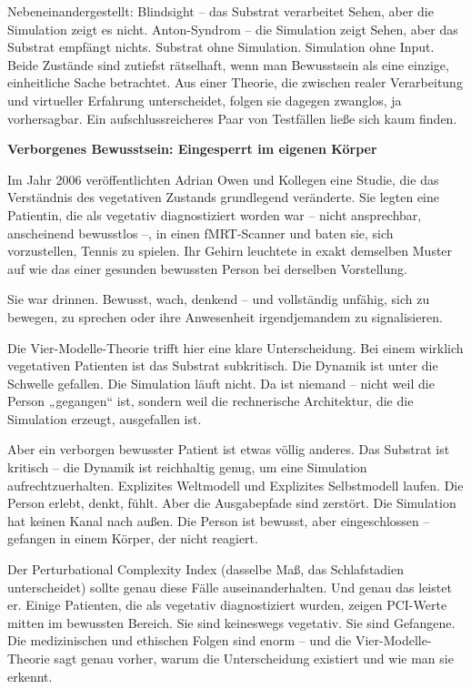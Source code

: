 \documentclass[11pt, twoside, openright]{book}
\begin{document}
Nebeneinandergestellt: Blindsight -- das Substrat verarbeitet Sehen, aber die Simulation zeigt es nicht. Anton-Syndrom -- die Simulation zeigt Sehen, aber das Substrat empfängt nichts. Substrat ohne Simulation. Simulation ohne Input. Beide Zustände sind zutiefst rätselhaft, wenn man Bewusstsein als eine einzige, einheitliche Sache betrachtet. Aus einer Theorie, die zwischen realer Verarbeitung und virtueller Erfahrung unterscheidet, folgen sie dagegen zwanglos, ja vorhersagbar. Ein aufschlussreicheres Paar von Testfällen ließe sich kaum finden.

\textbf{Verborgenes Bewusstsein: Eingesperrt im eigenen Körper}

Im Jahr 2006 veröffentlichten Adrian Owen und Kollegen eine Studie, die das Verständnis des vegetativen Zustands grundlegend veränderte. Sie legten eine Patientin, die als vegetativ diagnostiziert worden war -- nicht ansprechbar, anscheinend bewusstlos --, in einen fMRT-Scanner und baten sie, sich vorzustellen, Tennis zu spielen. Ihr Gehirn leuchtete in exakt demselben Muster auf wie das einer gesunden bewussten Person bei derselben Vorstellung.

Sie war drinnen. Bewusst, wach, denkend -- und vollständig unfähig, sich zu bewegen, zu sprechen oder ihre Anwesenheit irgendjemandem zu signalisieren.

Die Vier-Modelle-Theorie trifft hier eine klare Unterscheidung. Bei einem wirklich vegetativen Patienten ist das Substrat subkritisch. Die Dynamik ist unter die Schwelle gefallen. Die Simulation läuft nicht. Da ist niemand -- nicht weil die Person „gegangen“ ist, sondern weil die rechnerische Architektur, die die Simulation erzeugt, ausgefallen ist.

Aber ein verborgen bewusster Patient ist etwas völlig anderes. Das Substrat ist kritisch -- die Dynamik ist reichhaltig genug, um eine Simulation aufrechtzuerhalten. Explizites Weltmodell und Explizites Selbstmodell laufen. Die Person erlebt, denkt, fühlt. Aber die Ausgabepfade sind zerstört. Die Simulation hat keinen Kanal nach außen. Die Person ist bewusst, aber eingeschlossen -- gefangen in einem Körper, der nicht reagiert.

Der Perturbational Complexity Index (dasselbe Maß, das Schlafstadien unterscheidet) sollte genau diese Fälle auseinanderhalten. Und genau das leistet er. Einige Patienten, die als vegetativ diagnostiziert wurden, zeigen PCI-Werte mitten im bewussten Bereich. Sie sind keineswegs vegetativ. Sie sind Gefangene. Die medizinischen und ethischen Folgen sind enorm -- und die Vier-Modelle-Theorie sagt genau vorher, warum die Unterscheidung existiert und wie man sie erkennt.
\end{document}
